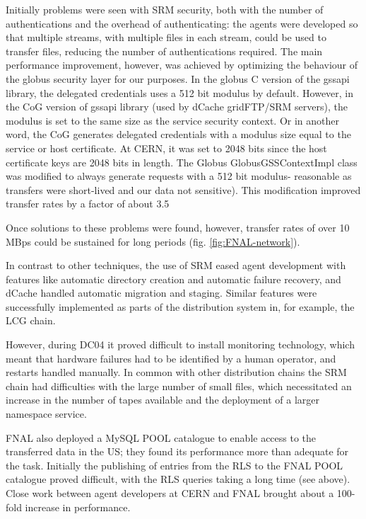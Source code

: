 \documentclass{cmspaper}
\begin{document}
Initially problems were seen with SRM security, both with the number
of authentications and the overhead of authenticating: the agents were
developed so that multiple streams, with multiple files in each
stream, could be used to transfer files, reducing the number of
authentications required. The main performance improvement, however,
was achieved by optimizing the behaviour of the globus security layer
for our purposes. In the globus C version of the gssapi library, the
delegated credentials uses a 512 bit modulus by default. However, in
the CoG version of gssapi library (used by dCache gridFTP/SRM
servers), the modulus is set to the same size as the service security
context. Or in another word, the CoG generates delegated credentials
with a modulus size equal to the service or host certificate.  At
CERN, it was set to 2048 bits since the host certificate keys are 2048
bits in length. The Globus GlobusGSSContextImpl class was modified to always generate
requests with a 512 bit modulus- reasonable as transfers were
short-lived and our data not sensitive). This modification improved transfer
rates by a factor of about 3.5

Once solutions to these problems were found, however, transfer rates
of over 10 MBps could be sustained for long periods
(fig. \ref{fig:FNAL-network}).

In contrast to other techniques, the use of SRM eased agent
development with features like automatic directory creation and
automatic failure recovery, and dCache handled automatic migration and
staging. Similar features were successfully implemented as parts of
the distribution system in, for example, the LCG chain.

However, during DC04 it proved difficult to install monitoring
technology, which meant that hardware failures had to be identified by
a human operator, and restarts handled manually. In common with other
distribution chains the SRM chain had difficulties with the large
number of small files, which necessitated an increase in the number of
tapes available and the deployment of a larger namespace service.

FNAL also deployed a MySQL POOL catalogue to enable access to the
transferred data in the US; they found its performance more than
adequate for the task. Initially the publishing of entries from the
RLS to the FNAL POOL catalogue proved difficult, with the RLS queries
taking a long time (see above). Close work between agent developers at
CERN and FNAL brought about a 100-fold increase in performance.
\end{document}

